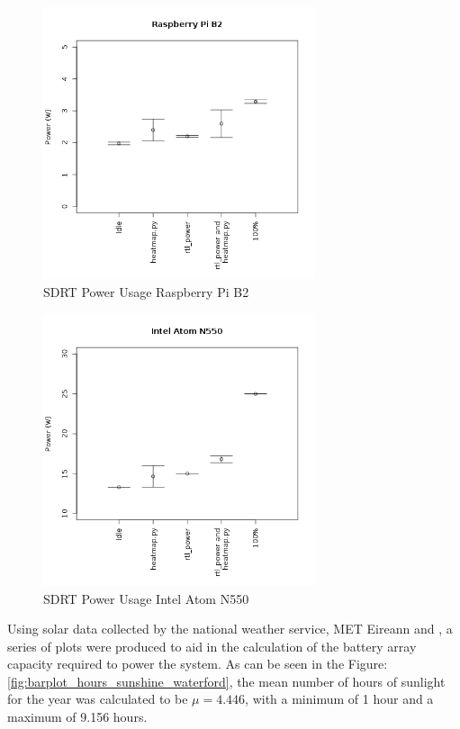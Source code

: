 \documentclass[runningheads,a4paper]{llncs}
\begin{document}
%
\begin{figure}[!htb]
	\centering
	\includegraphics[width=8cm]{images/60}
	\caption{SDRT Power Usage Raspberry Pi B2}
	\label{fig:sdrt_power_usage_pi_b2}
\end{figure}
%

%
\begin{figure}[!htb]
	\centering
	\includegraphics[width=8cm]{images/61}
	\caption{SDRT Power Usage Intel Atom N550}
	\label{fig:sdrt_power_usage_atom_n55}
\end{figure}
%

\newpage
Using solar data collected by the national weather service, MET Eireann \citep{MET-15} and \citep{ECAD-15}, a series of plots were produced to aid in the calculation of the battery array capacity required to power the system. As can be seen in the Figure: \ref{fig:barplot_hours_sunshine_waterford}, the mean number of hours of sunlight for the year was calculated to be $\mu = 4.446$, with a minimum of 1 hour and a maximum of 9.156 hours.
\end{document}
